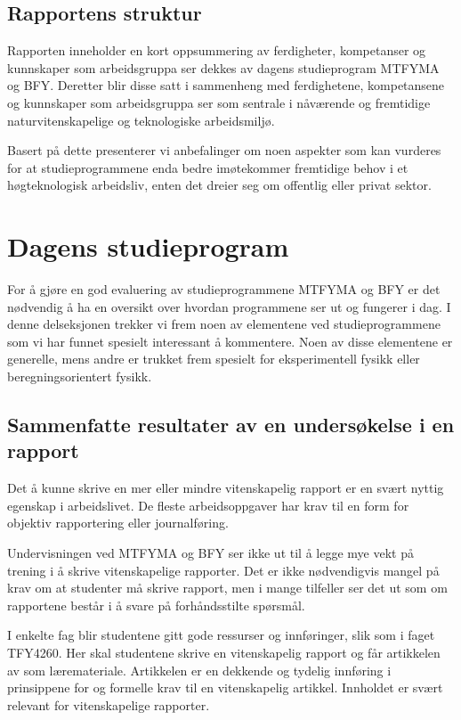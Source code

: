 \documentclass{article}
\begin{document}
\subsection{Rapportens struktur}
Rapporten inneholder en kort oppsummering av ferdigheter, kompetanser og kunnskaper som arbeidsgruppa ser dekkes av dagens studieprogram MTFYMA og BFY. Deretter blir disse satt i sammenheng med ferdighetene, kompetansene og kunnskaper som arbeidsgruppa ser som sentrale i nåværende og fremtidige naturvitenskapelige og teknologiske arbeidsmiljø.

Basert på dette presenterer vi anbefalinger om noen aspekter som kan vurderes for at studieprogrammene enda bedre imøtekommer fremtidige behov i et høgteknologisk arbeidsliv, enten det dreier seg om offentlig eller privat sektor.

\section{Dagens studieprogram}
\label{Sammenlikning}
For å gjøre en god evaluering av studieprogrammene MTFYMA og BFY er det nødvendig å ha en oversikt over hvordan programmene ser ut og fungerer i dag. I denne delseksjonen trekker vi frem noen av elementene ved studieprogrammene som vi har funnet spesielt interessant å kommentere. Noen av disse elementene er generelle, mens andre er trukket frem spesielt for eksperimentell fysikk eller beregningsorientert fysikk.

\subsection{Sammenfatte resultater av en undersøkelse i en rapport}
\label{Rapport}
Det å kunne skrive en mer eller mindre vitenskapelig rapport er en svært nyttig egenskap i arbeidslivet. De fleste arbeidsoppgaver har krav til en form for objektiv rapportering eller journalføring.

Undervisningen ved MTFYMA og BFY ser ikke ut til å legge mye vekt på trening i å skrive vitenskapelige rapporter. Det er ikke nødvendigvis mangel på krav om at studenter må skrive rapport, men i mange tilfeller ser det ut som om rapportene består i å svare på forhåndsstilte spørsmål.

I enkelte fag blir studentene gitt gode ressurser og innføringer, slik som i faget TFY4260. Her skal studentene skrive en vitenskapelig rapport og får artikkelen av \citet{Ecarnot2015} som læremateriale. Artikkelen er en dekkende og tydelig innføring i prinsippene for og formelle krav til en vitenskapelig artikkel. Innholdet er svært relevant for vitenskapelige rapporter.
\end{document}

